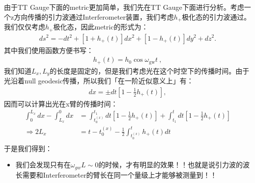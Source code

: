 由于TT Gauge下面的metric更加简单，我们先在TT
Gauge下面进行分析。考虑一个z方向传播的引力波通过Interferometer装置，我们考虑$ h_+
$极化态的引力波通过。我们仅仅考虑$ h_+ $极化态，因此metric的形式为：
\begin{align}
  ds^2=-dt^2+[1+h_+(t)]dx^2+[1-h_+(t)]dy^2+dz^2.
\end{align}
其中我们使用函数方便书写：
\begin{align}
  h_+(t)=h_0\cos\omega_\mathrm{gw}t\mathrm{~,}
\end{align}
我们知道$ L_x,L_y $的长度是固定的，但是我们考虑光在这个时空下的传播时间。由于光沿着null geodesic传播，所以我们「在一阶近似意义上」有：
\begin{align}
  dx=\pm dt\left[1-\frac{1}{2}h_+(t)\right],
\end{align}
因而可以计算出光在x臂的传播时间：
\begin{align}
  \int_0^{L_x}dx - \int_{L_x}^{0}dx &= \int_{t_0^{(x)}}^{t_1}
  dt\left[1-\frac{1}{2}h_+(t)\right] + \int_{t_1}^{t}
  dt\left[1-\frac{1}{2}h_+(t)\right] \\
  \Rightarrow 2L_x &= t- t_0^{(x)} - \frac{1}{2}\int_{t_0^{(x)}}^{t}
  h_+(t) dt \\
\end{align}
于是我们得到：
\begin{itemize}
  \item 我们会发现只有在$ \omega_{gw}L \sim 0
    $的时候，才有明显的效果！！也就是说引力波的波长需要和Interferometer的臂长在同一个量级上才能够被测量到！！
\end{itemize}

\bigskip
{}

